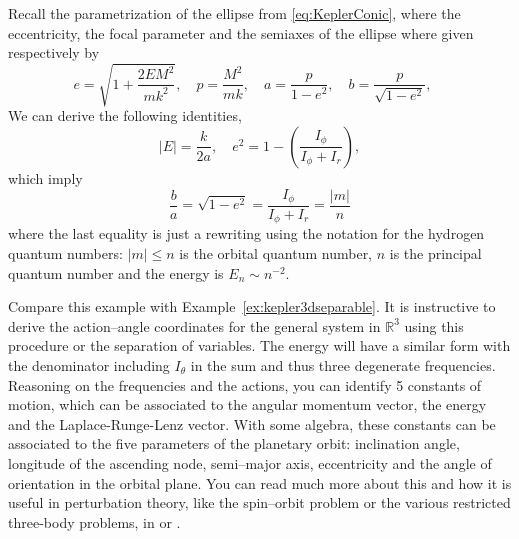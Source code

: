 \documentclass[english,fontsize=11pt,paper=a5,oneside]{scrbook}
\newcommand{\R}{\mathbb{R}}
\theoremstyle{definition}
\newenvironment{example}
  {\pushQED{\qed}\renewcommand{\qedsymbol}{$\lozenge$}\examplex}
  {\popQED\endexamplex}
\begin{document}
\begin{example}[Kepler problem -- elliptic motion]
    Recall the parametrization of the ellipse from \eqref{eq:KeplerConic}, where the eccentricity, the focal parameter and the semiaxes of the ellipse where given respectively by
    \begin{equation}
        e = \sqrt{1+ \frac{2EM^2}{mk^2}}, \quad
        p = \frac{M^2}{mk}, \quad
        a = \frac{p}{1-e^2}, \quad
        b = \frac{p}{\sqrt{1-e^2}}, \quad
    \end{equation}
    We can derive the following identities,
    \begin{equation}
        |E| = \frac{k}{2a}, \quad e^2 = 1 - \left(\frac{I_\phi}{ I_\phi + I_r}\right),
    \end{equation}
    which imply
    \begin{equation}
        \frac{b}{a} = \sqrt{1-e^2} = \frac{I_\phi}{I_\phi + I_r} = \frac{|m|}{n}
    \end{equation}
    where the last equality is just a rewriting using the notation for the hydrogen quantum numbers: $|m| \leq n$ is the orbital quantum number, $n$ is the principal quantum number and the energy is $E_n \sim n^{-2}$.

    Compare this example with Example~\ref{ex:kepler3dseparable}.
    It is instructive to derive the action--angle coordinates for the general system in $\R^3$ using this procedure or the separation of variables.
    The energy will have a similar form with the denominator including $I_\theta$ in the sum and thus three degenerate frequencies.
    Reasoning on the frequencies and the actions, you can identify 5 constants of motion, which can be associated to the angular momentum vector, the energy and the Laplace-Runge-Lenz vector.
    With some algebra, these constants can be associated to the five parameters of the planetary orbit: inclination angle, longitude of the ascending node, semi--major axis, eccentricity and the angle of orientation in the orbital plane.
    You can read much more about this and how it is useful in perturbation theory, like the spin--orbit problem or the various restricted three-body problems, in \cite{book:arnoldcelestial} or \cite{book:celletti}.
\end{example}
\end{document}
